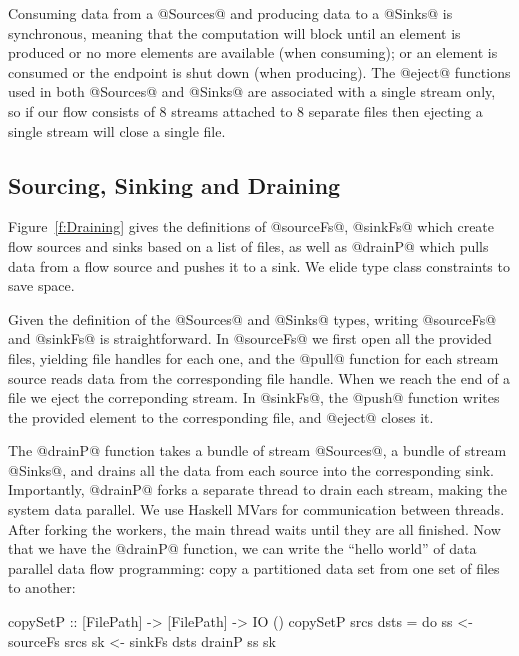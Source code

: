 Consuming data from a @Sources@ and producing data to a @Sinks@ is synchronous, meaning that the computation will block until an element is produced or no more elements are available (when consuming); or an element is consumed or the endpoint is shut down (when producing). The @eject@ functions used in both @Sources@ and @Sinks@ are associated with a single stream only, so if our flow consists of 8 streams attached to 8 separate files then ejecting a single stream will close a single file.


\subsection{Sourcing, Sinking and Draining}
Figure~\ref{f:Draining} gives the definitions of @sourceFs@, @sinkFs@ which create flow sources and sinks based on a list of files, as well as @drainP@ which pulls data from a flow source and pushes it to a sink. We elide type class constraints to save space.

Given the definition of the @Sources@ and @Sinks@ types, writing @sourceFs@ and @sinkFs@ is straightforward. In @sourceFs@ we first open all the provided files, yielding file handles for each one, and the @pull@ function for each stream source reads data from the corresponding file handle. When we reach the end of a file we eject the correponding stream. In @sinkFs@, the @push@ function writes the provided element to the corresponding file, and @eject@ closes it.

The @drainP@ function takes a bundle of stream @Sources@, a bundle of stream @Sinks@, and drains all the data from each source into the corresponding sink. Importantly, @drainP@ forks a separate thread to drain each stream, making the system data parallel. We use Haskell MVars for communication between threads. After forking the workers, the main thread waits until they are all finished. Now that we have the @drainP@ function, we can write the ``hello world'' of data parallel data flow programming: copy a partitioned data set from one set of files to another:

\begin{code}
 copySetP :: [FilePath] -> [FilePath] -> IO ()
 copySetP srcs dsts
  = do  ss <- sourceFs srcs
        sk <- sinkFs   dsts
        drainP ss sk
\end{code}


